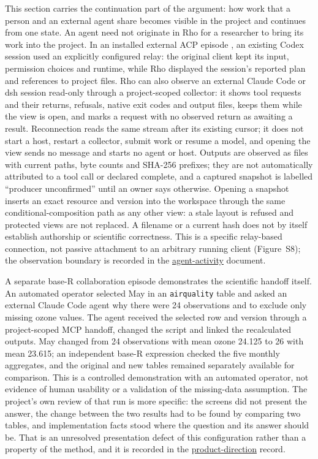 \documentclass[11pt]{article}
\begin{document}
This section carries the continuation part of the argument: how work that a person and an external agent share becomes visible in the project and continues from one state. An agent need not originate in Rho for a researcher to bring its work into the project. In an installed external ACP episode \cite{acp}, an existing Codex session used an explicitly configured relay: the original client kept its input, permission choices and runtime, while Rho displayed the session's reported plan and references to project files. Rho can also observe an external Claude Code or dsh session read-only through a project-scoped collector: it shows tool requests and their returns, refusals, native exit codes and output files, keeps them while the view is open, and marks a request with no observed return as awaiting a result. Reconnection reads the same stream after its existing cursor; it does not start a host, restart a collector, submit work or resume a model, and opening the view sends no message and starts no agent or host. Outputs are observed as files with current paths, byte counts and SHA-256 prefixes; they are not automatically attributed to a tool call or declared complete, and a captured snapshot is labelled ``producer unconfirmed'' until an owner says otherwise. Opening a snapshot inserts an exact resource and version into the workspace through the same conditional-composition path as any other view: a stale layout is refused and protected views are not replaced. A filename or a current hash does not by itself establish authorship or scientific correctness. This is a specific relay-based connection, not passive attachment to an arbitrary running client (Figure~S8); the observation boundary is recorded in the \href{https://github.com/YuLab-SMU/Rho/blob/main/docs/AGENT-ACTIVITY.md}{agent-activity} document.

A separate base-R collaboration episode \cite{baser} demonstrates the scientific handoff itself. An automated operator selected May in an \texttt{airquality} table and asked an external Claude Code agent why there were 24 observations and to exclude only missing ozone values. The agent received the selected row and version through a project-scoped MCP handoff, changed the script and linked the recalculated outputs. May changed from 24 observations with mean ozone 24.125 to 26 with mean 23.615; an independent base-R expression checked the five monthly aggregates, and the original and new tables remained separately available for comparison. This is a controlled demonstration with an automated operator, not evidence of human usability or a validation of the missing-data assumption. The project's own review of that run is more specific: the screens did not present the answer, the change between the two results had to be found by comparing two tables, and implementation facts stood where the question and its answer should be. That is an unresolved presentation defect of this configuration rather than a property of the method, and it is recorded in the \href{https://github.com/YuLab-SMU/Rho/blob/main/docs/ROADMAP.md}{product-direction} record.
\end{document}
